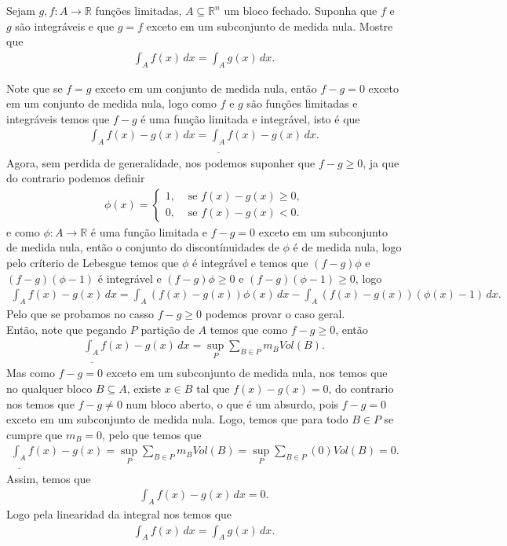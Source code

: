 \begin{homeworkProblem}[Seção 2-3]
  Sejam $g,f:A\to\mathbb{R}$ funções limitadas, $A\subseteq\mathbb{R}^{n}$ um bloco fechado. Suponha que $f$ e $g$ são integráveis e que $g=f$ exceto em um subconjunto de medida nula. Mostre que
  \begin{align*}
    \int_{A}f(x)\,dx=\int_{A}g(x)\,dx.
  \end{align*}
  \begin{solution}
    Note que se $f=g$ exceto em um conjunto de medida nula, então $f-g=0$ exceto em um conjunto de medida nula, logo como $f$ e $g$ são funções limitadas e integráveis temos que $f-g$ é uma função limitada e integrável, isto é que
    \begin{align*}
      \int_{A}f(x)-g(x)\,dx=\underline{\int_{A}}f(x)-g(x)\,dx.
    \end{align*}
    Agora, sem perdida de generalidade, nos podemos suponher que $f-g\geq 0$, ja que do contrario podemos definir
    \begin{align*}
      \phi(x)= 
      \begin{cases}
        1, &\text{ se } f(x)-g(x)\geq 0 \text{,} \\
        0, &\text{ se } f(x)-g(x)< 0.
      \end{cases}
    \end{align*}
    e como $\phi:A\to\mathbb{R}$ é uma função limitada e $f-g=0$ exceto em um subconjunto de medida nula, então o conjunto do discontínuidades de $\phi$ é de medida nula, logo pelo críterio de Lebesgue temos que $\phi$ é integrável e temos que $(f-g)\phi$ e $(f-g)(\phi-1)$ é integrável e $(f-g)\phi\geq 0$ e $(f-g)(\phi-1)\geq 0$, logo
    \begin{align*}
      \int_{A}f(x)-g(x)\,dx=\int_{A}(f(x)-g(x))\phi(x)\,dx-\int_{A}(f(x)-g(x))(\phi(x)-1)\,dx.
    \end{align*}
    Pelo que se probamos no casso $f-g\geq 0$ podemos provar o caso geral.\\
    Então, note que pegando $P$ partição de $A$ temos que como $f-g\geq 0$, então
    \begin{align*}
      \underline{\int_{A}}f(x)-g(x)\,dx=\sup_{P}\sum_{B\in P}m_{B}Vol(B).
    \end{align*}
    Mas como $f-g=0$ exceto em um subconjunto de medida nula, nos temos que no qualquer bloco $B\subseteq A$, existe $x\in B$ tal que $f(x)-g(x)=0$, do contrario nos temos que $f-g\neq 0$ num bloco aberto, o que é um absurdo, pois $f-g=0$ exceto em um subconjunto de medida nula. Logo, temos que para todo $B\in P$ se cumpre que $m_{B}=0$, pelo que temos que
    \begin{align*}
      \underline{\int_{A}}f(x)-g(x)=\sup_{P}\sum_{B\in P}m_BVol(B)=\sup_{P}\sum_{B\in P}(0)Vol(B)=0.
    \end{align*}
    Assim, temos que
    \begin{align*}
      \int_{A}f(x)-g(x)\,dx=0.
    \end{align*}
    Logo pela linearidad da integral nos temos que
    \begin{align*}
      \int_{A}f(x)\,dx=\int_{A}g(x)\,dx.
    \end{align*}
  \end{solution}
\end{homeworkProblem}
